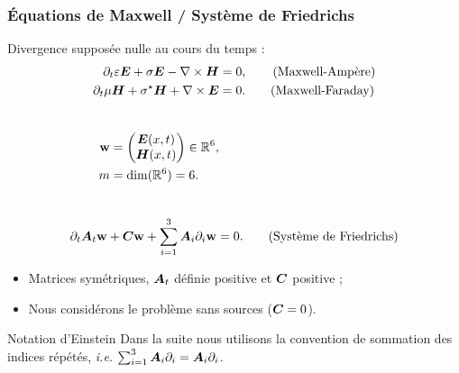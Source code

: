 \begin{frame}
\frametitle{Équations de Maxwell / Système de Friedrichs}
\vfill
Divergence supposée nulle au cours du temps :
\begin{align*}
	\partial_{t} \varepsilon \bm{E} + \sigma \bm{E} - \nabla\times \bm{H} &= 0 ,
	\tag{Maxwell-Ampère}
	\\
	\partial_{t} \mu \bm{H} + \sigma^\star \bm{H} + \nabla\times \bm{E} &= 0 .
	\tag{Maxwell-Faraday}
\end{align*}
\vfill
\begin{columns}%
\begin{figure}
\end{figure}
\begin{align*}
\bm{\mathrm{w}} &= 
\begin{pmatrix}
	\bm{E}(x,t) \\
	\bm{H}(x,t)
\end{pmatrix}
\in \mathbb{R}^6 ,
\\
m &= \dim(\mathbb{R}^6) = 6 .
\end{align*}
\end{columns}
\vfill
\begin{align*}
	\partial_{t} \bm{A}_{t} \bm{\mathrm{w}} + \bm{C} \bm{\mathrm{w}} + \sum_{i=1}^3 {\bm{A}_{i}\partial_{i}} \bm{\mathrm{w}} = 0 .
	\tag{Système de Friedrichs}
\end{align*}
\vfill
\begin{itemize}
\item Matrices symétriques, $\bm{A}_{t}$ définie positive et $\bm{C}$ positive ;
\item Nous considérons le problème sans sources ($\bm{C} = 0$).
\end{itemize}
\begin{block}{Notation d'Einstein}
Dans la suite nous utilisons la convention de sommation des indices répétés,
\textit{i.e.} $\sum_{i=1}^3 {\bm{A}_{i}\partial_{i}} = {\bm{A}_{i}\partial_{i}}$.
\end{block}
\vfill
\end{frame}


